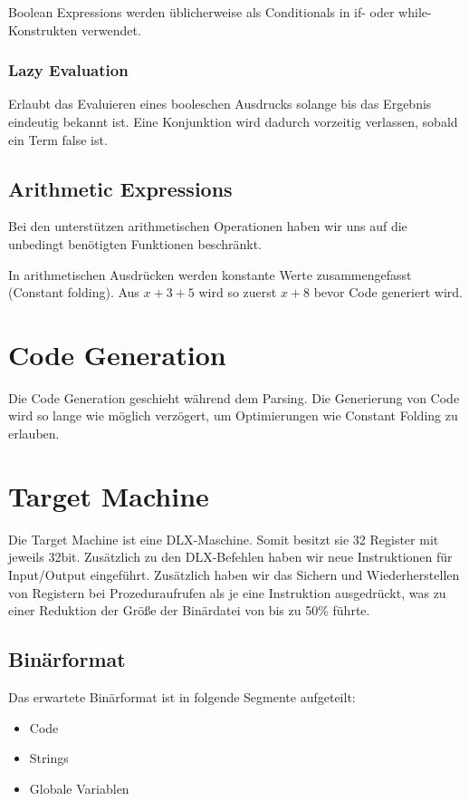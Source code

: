 \documentclass[a4paper,12pt]{article}
\begin{document}
	Boolean Expressions werden üblicherweise als Conditionals in if- oder while-Konstrukten verwendet.

	\subsubsection{Lazy Evaluation}

	Erlaubt das Evaluieren eines booleschen Ausdrucks solange bis das Ergebnis eindeutig bekannt ist.
	Eine Konjunktion wird dadurch vorzeitig verlassen, sobald ein Term false ist.

	\subsection{Arithmetic Expressions}
	Bei den unterstützen arithmetischen Operationen haben wir uns auf die unbedingt benötigten Funktionen beschränkt.

	In arithmetischen Ausdrücken werden konstante Werte zusammengefasst (Constant folding).
	Aus $x + 3 + 5$ wird so zuerst $x+8$ bevor Code generiert wird.

	\section{Code Generation}
	Die Code Generation geschieht während dem Parsing.
	Die Generierung von Code wird so lange wie möglich verzögert, um Optimierungen wie Constant Folding zu erlauben.

	\section{Target Machine}
	Die Target Machine ist eine DLX-Maschine.
	Somit besitzt sie 32 Register mit jeweils 32bit.
	Zusätzlich zu den DLX-Befehlen haben wir neue Instruktionen für Input/Output eingeführt.
	Zusätzlich haben wir das Sichern und Wiederherstellen von Registern bei Prozeduraufrufen als je eine Instruktion ausgedrückt,
	was zu einer Reduktion der Größe der Binärdatei von bis zu 50\% führte.

	\subsection{Binärformat}
	Das erwartete Binärformat ist in folgende Segmente aufgeteilt:
	\begin{itemize}
		\item Code
		\item Strings
		\item Globale Variablen
	\end{itemize}
\end{document}
